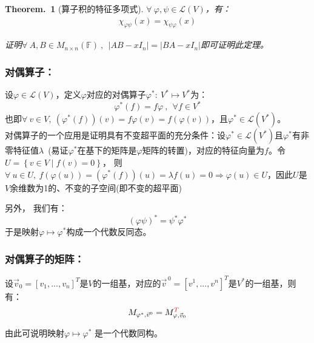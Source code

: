 \documentclass[zihao=-4,UTF8]{report}
\theoremstyle{mystyle} %
\newtheorem{theorem}{Theorem.\,}
\begin{document}
\begin{theorem}[算子积的特征多项式]\label{算子积的特征多项式}
$\forall\ \varphi,\psi \in \mathscr{L}(V)$，有：
\begin{align*}
    \chi_{\varphi \psi}(x) =  \chi_{ \psi \varphi}(x)
\end{align*}
{\par\color{gray}\small
证明$\forall\ A,B\in M_{n\times n}(\mathbb{F})\ , \ \ \left | AB - xI_n \right | = \left | BA - xI_n \right |$即可证明此定理。
\par}

\end{theorem}

\subsubsection{对偶算子：}
设$\varphi \in \mathscr{L}(V)$，定义$\varphi$对应的对偶算子$\varphi^*:\ V^* \longmapsto V^*$为：
\begin{equation*}
    \varphi^*(f) = f\varphi\ ,\ \  \forall f \in V^*
\end{equation*}
也即$\forall\ v \in V,\ (\varphi^*(f))(v) =  f\varphi(v) = f(\varphi(v))$，且$\varphi^* \in \mathscr{L}(V^*)$。\\
{\color{gray}\small 对偶算子的一个应用是证明具有不变超平面的充分条件：设$\varphi^* \in \mathscr{L}(V^*)$且$\varphi^*$有非零特征值$\lambda$\ (易证$\varphi^*$在基下的矩阵是$\varphi$矩阵的转置)，对应的特征向量为$f$。令$U = \left\{v\in V\mid f(v) = 0 \right\}$，
则$\forall\ u \in U,\  f(\varphi(u)) = (\varphi^*(f))(u) = \lambda f(u) = 0 \Longrightarrow \varphi(u) \in U$，因此$U$是$V$余维数为1的、不变的子空间(即不变的超平面)}\par
另外， 我们有：
\begin{equation*}
    (\varphi\psi)^* = \psi^*\varphi^*
\end{equation*}
于是映射$\varphi \longmapsto \varphi^*$构成一个代数反同态。
\subsubsection{对偶算子的矩阵：}
设$\vec{v}_0 = [v_1,...,v_n]^T$是$V$的一组基，对应的$\vec{v}^{\,0} = [v^1,...,v^n]^T$是$V^*$的一组基，则有：
\begin{equation*}
    M_{\varphi^*,\vec{v}^{0}} = M_{\varphi, \vec{v}_0}^{\textcolor{red}{T}}
\end{equation*}
{\color{gray}\small 由此可说明映射$\varphi \longmapsto \varphi^*$ 是一个代数同构。\par
}
\end{document}
